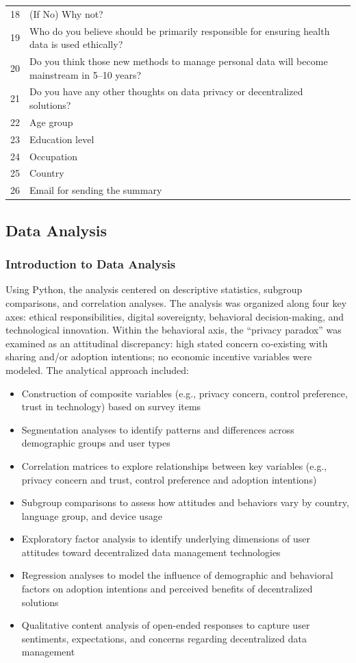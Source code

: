 \begin{table}[ht]
\begin{tabular}{p{1.5cm} p{13cm}}
			18 & (If No) Why not? \\
			19 & Who do you believe should be primarily responsible for ensuring health data is used ethically? \\
			20 & Do you think those new methods to manage personal data will become mainstream in 5–10 years? \\
			21 & Do you have any other thoughts on data privacy or decentralized solutions? \\
			22 & Age group \\
			23 & Education level \\
			24 & Occupation \\
			25 & Country \\
			26 & Email for sending the summary \\
			\bottomrule
		\end{tabular}
		\label{tab:survey_questions}
	\end{table}
	\clearpage
\subsection{Data Analysis}
	\subsubsection{Introduction to Data Analysis}
	Using Python, the analysis centered on descriptive statistics, subgroup comparisons, and correlation analyses. The analysis was organized along four key axes: ethical responsibilities, digital sovereignty, behavioral decision-making, and technological innovation. Within the behavioral axis, the “privacy paradox” was examined as an attitudinal discrepancy: high stated concern co‑existing with sharing and/or adoption intentions; no economic incentive variables were modeled.
	The analytical approach included:
	\begin{itemize}
		\item Construction of composite variables (e.g., privacy concern, control preference, trust in technology) based on survey items
		\item Segmentation analyses to identify patterns and differences across demographic groups and user types
		\item Correlation matrices to explore relationships between key variables (e.g., privacy concern and trust, control preference and adoption intentions)
		\item Subgroup comparisons to assess how attitudes and behaviors vary by country, language group, and device usage
		\item Exploratory factor analysis to identify underlying dimensions of user attitudes toward decentralized data management technologies
		\item Regression analyses to model the influence of demographic and behavioral factors on adoption intentions and perceived benefits of decentralized solutions
		\item Qualitative content analysis of open-ended responses to capture user sentiments, expectations, and concerns regarding decentralized data management
	\end{itemize}
